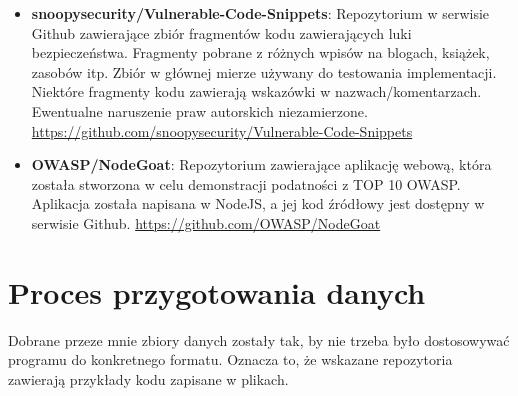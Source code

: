 \begin{itemize}
    \item \textbf{snoopysecurity/Vulnerable-Code-Snippets}: Repozytorium w serwisie Github zawierające zbiór fragmentów kodu zawierających luki bezpieczeństwa. Fragmenty pobrane z różnych wpisów na blogach, książek, zasobów itp. 
    Zbiór w głównej mierze używany do testowania implementacji. Niektóre fragmenty kodu zawierają wskazówki w nazwach/komentarzach. Ewentualne naruszenie praw autorskich niezamierzone.\\ \url{https://github.com/snoopysecurity/Vulnerable-Code-Snippets}



    \item \textbf{OWASP/NodeGoat}: Repozytorium zawierające aplikację webową, która została stworzona w celu demonstracji podatności z TOP 10 OWASP. Aplikacja została napisana w NodeJS, a jej kod źródłowy jest dostępny w serwisie Github. \url{https://github.com/OWASP/NodeGoat}

\end{itemize}

\section{Proces przygotowania danych}
\label{sec:proces_przygotowania_danych}

Dobrane przeze mnie zbiory danych zostały tak, by nie trzeba było dostosowywać programu do konkretnego formatu. Oznacza to, że wskazane repozytoria zawierają przykłady kodu zapisane w plikach.

